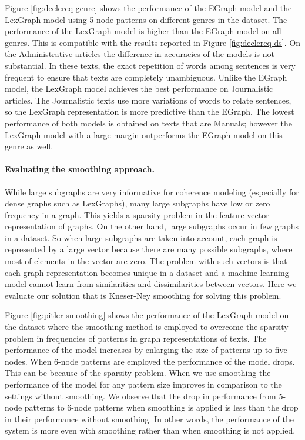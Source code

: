 Figure \ref{fig:declercq-genre} shows the performance of the EGraph model and the LexGraph model using 5-node patterns on different genres in the \declercqds dataset. 
The performance of the LexGraph model is higher than the EGraph model on all genres. 
This is compatible with the results reported in Figure \ref{fig:declercq-ds}. 
On the Administrative articles the difference in accuracies of the models is not substantial.  
In these texts, the exact repetition of words among sentences is very frequent to ensure that texts are completely unambiguous. 
Unlike the EGraph model, the LexGraph model achieves the best performance on Journalistic articles. 
The Journalistic texts use more variations of words to relate sentences, so the LexGraph representation is more predictive than the EGraph. 
The lowest performance of both models is obtained on texts that are Manuals; however the LexGraph model with a large margin outperforms the EGraph model on this genre as well. 

\paragraph{Evaluating the smoothing approach.}
While large subgraphs are very informative for coherence modeling (especially for dense graphs such as LexGraphs), many large subgraphs have low or zero frequency in a graph.
This yields a sparsity problem in the feature vector representation of graphs. 
On the other hand, large subgraphs occur in few graphs in a dataset. 
So when large subgraphs are taken into account, each graph is represented by a large vector because there are many possible subgraphs, where most of elements in the vector are zero.   
The problem with such vectors is that each graph representation becomes unique in a dataset and a machine learning model cannot learn from similarities and dissimilarities between vectors. 
Here we evaluate our solution that is \mbox{Kneser-Ney} smoothing for solving this problem. 

Figure \ref{fig:pitler-smoothing} shows the performance of the LexGraph model on the \pitlerds dataset where the smoothing method is employed to overcome the sparsity problem in frequencies of patterns in graph representations of texts. 
The performance of the model increases by enlarging the size of patterns up to five nodes. 
When 6-node patterns are employed the performance of the model drops. 
This can be because of the sparsity problem. 
When we use smoothing the performance of the model for any pattern size improves in comparison to the settings without smoothing.  
We observe that the drop in performance from 5-node patterns to 6-node patterns when smoothing is applied is less than the drop in their performance without smoothing.
In other words, the performance of the system is more even with smoothing rather than when smoothing is not applied. 

